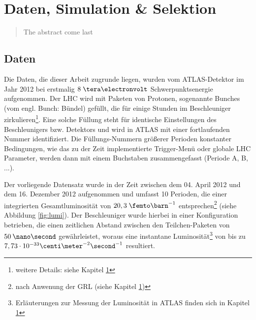 


\chapter{Daten, Simulation \& Selektion}

\begin{quote}
    The abstract come last
\end{quote}



\section{Daten}
\label{data_sim_selection:data}


Die Daten, die dieser Arbeit zugrunde liegen, wurden vom ATLAS-Detektor im Jahr
2012 bei erstmalig $8 \TeV$ Schwerpunktsenergie aufgenommen. Der \ac{LHC} wird
mit Paketen von Protonen, sogenannte Bunches (vom engl. Bunch: Bündel) gefüllt,
die für einige Stunden im Beschleuniger zirkulieren\footnote{weitere Details:
siehe Kapitel \ref{}}.
Eine solche Füllung steht für identische Einstellungen des Beschleunigers bzw.
Detektors und wird in ATLAS mit einer fortlaufenden Nummer identifiziert.
Die Füllungs-Nummern größerer Perioden konstanter Bedingungen, wie das zu der
Zeit implementierte Trigger-Menü oder globale \ac{LHC} Parameter, werden dann
mit einem Buchstaben zusammengefasst (Periode A, B, ...).

Der vorliegende Datensatz wurde in der Zeit zwischen dem 04. April 2012 und dem
16. Dezember 2012 aufgenommen und umfasst 10 Perioden, die einer integrierten
Gesamtluminosität von $20,3 \fb^{-1}$ entsprechen\footnote{nach Anwenung der
\ac{GRL} (siehe Kapitel \ref{})} (siehe Abbildung \ref{fig:lumi}). Der
Beschleuniger wurde hierbei in einer Konfiguration betrieben, die einen
zeitlichen Abstand zwischen den Teilchen-Paketen von $50\:\nano\second$
gewährleistet, woraus eine instantane Luminosität\footnote{Erläuterungen zur
Messung der Luminosität in ATLAS finden sich in Kapitel \ref{}} von bis zu
$7,73 \cdot 10^{-33} \centi\meter^{-2}\second^{-1}$ resultiert.

